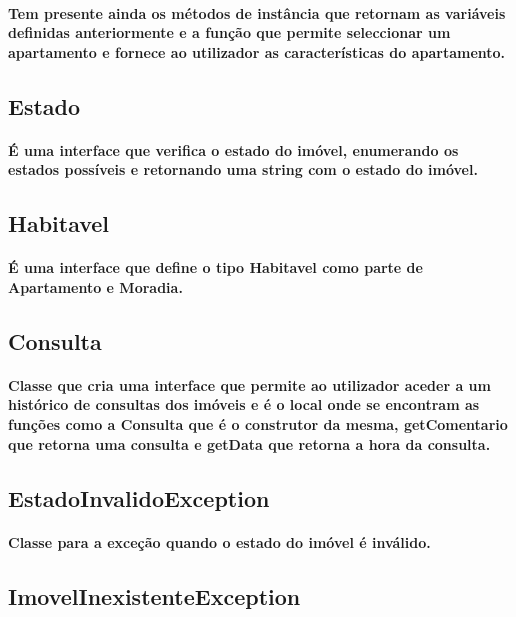 \documentclass{article}
\begin{document}
\paragraph{Tem presente ainda os métodos de instância que retornam as variáveis definidas anteriormente e a função que permite seleccionar um apartamento e fornece ao utilizador as características do apartamento.}

\subsection{\textbf{Estado}}
\paragraph{É uma interface que verifica o estado do imóvel, enumerando os estados possíveis e retornando uma string com o estado do imóvel.}

\subsection{\textbf{Habitavel}}
\paragraph{É uma interface que define o tipo Habitavel como parte de Apartamento e Moradia.}

\subsection{\textbf{Consulta}}
\paragraph{Classe que cria uma interface que permite ao utilizador aceder a um histórico de consultas dos imóveis e é o local onde se encontram as funções como a Consulta que é o construtor da mesma, getComentario que retorna uma consulta e getData que retorna a hora da consulta.}

\subsection{\textbf{EstadoInvalidoException}}
\paragraph{Classe para a exceção quando o estado do imóvel é inválido.}

\subsection{\textbf{ImovelInexistenteException}}
\end{document}
